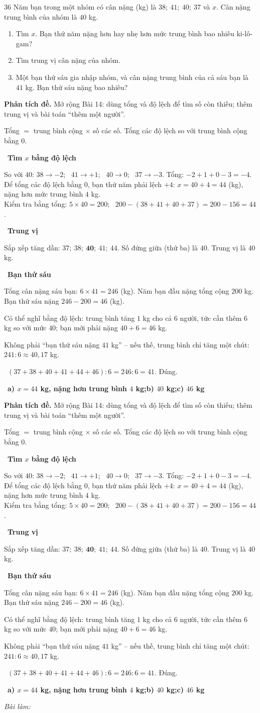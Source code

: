 \documentclass[11pt]{article}
\newif\ifsol \soltrue
\providecommand{\AnsWord}{Đáp số}
\newenvironment{probbox}[2]{\begin{probboxT}{#1}{#2}}{\end{probboxT}}
\newcommand{\StuProb}[2]{\begin{probboxS}{#1}{#2}\StuProbBody\end{probboxS}}
\newcommand{\ans}[1]{\par\smallskip{\bfseries\color{tmGreen!88!black}\AnsWord:}\ {\bfseries\color{AnsRed}#1}\par}
\newcommand{\probsol}[1]{%
  \begin{lrbox}{\solmeasure}\begin{minipage}{\dimexpr\linewidth-24pt\relax}#1\end{minipage}\end{lrbox}%
  \ifsol
    \begin{solbox}#1\end{solbox}%
  \else
    \setlength{\solht}{\dimexpr\ht\solmeasure+\dp\solmeasure+0.85cm\relax}%
    \ifdim\solht<1.35cm\setlength{\solht}{1.35cm}\fi
    \ifdim\solht>\StudentMaxWork\setlength{\solht}{\StudentMaxWork}\fi
    \par\noindent\begin{minipage}{\linewidth}%
    \expandafter\StuProb\StuProbArgs
    \begin{tcolorbox}[colback=white,colframe=Line,boxrule=0.8pt,arc=5pt,
      left=8pt,right=8pt,top=4pt,bottom=4pt,height=\solht]{\footnotesize\color{Slate}\itshape\WorkWord}\end{tcolorbox}%
    \end{minipage}\par\medskip
  \fi}
\newlength{\StudentMaxWork}\setlength{\StudentMaxWork}{4.5cm}
\newcommand{\step}[2]{\par\smallskip\noindent{\bfseries\color{tmBlue!85!black}\StepWord~#1.}\ {\bfseries #2}\par\nopagebreak}
\newcommand{\verify}[1]{\par\smallskip\noindent{\bfseries\color{tmGreen!80!black}\faCheckCircle\ \CheckWord}\ #1\par}
\def\WorkWord{Bài làm:}
\def\AnsWord{Đáp số}
\def\StepWord{Bước}
\def\CheckWord{Thử lại:}
\begin{document}
\begin{probbox}{36}{\relax}
Năm bạn trong một nhóm có cân nặng (kg) là $38;\ 41;\ 40;\ 37$ và $x$. Cân nặng trung bình của nhóm là $40$ kg.
\begin{enumerate}[label=\alph*),leftmargin=1.6em,itemsep=0pt,topsep=2pt]
  \item Tìm $x$. Bạn thứ năm nặng hơn hay nhẹ hơn mức trung bình bao nhiêu ki-lô-gam?
  \item Tìm trung vị cân nặng của nhóm.
  \item Một bạn thứ sáu gia nhập nhóm, và cân nặng trung bình của cả sáu bạn là $41$ kg. Bạn thứ sáu nặng bao nhiêu?
\end{enumerate}
\end{probbox}
\probsol{
\textbf{Phân tích đề.} Mở rộng Bài 14: dùng tổng và độ lệch để tìm số còn thiếu; thêm trung vị và bài toán ``thêm một người''.
\begin{recallbox}Tổng $=$ trung bình cộng $\times$ số các số. Tổng các độ lệch so với trung bình cộng bằng $0$.\end{recallbox}
\step{1}{Tìm $x$ bằng độ lệch}
So với $40$: $38 \to -2$; \ $41 \to +1$; \ $40 \to 0$; \ $37 \to -3$. Tổng: $-2 + 1 + 0 - 3 = -4$.\\
Để tổng các độ lệch bằng $0$, bạn thứ năm phải lệch $+4$: $x = 40 + 4 = 44$ (kg), nặng hơn mức trung bình $4$ kg.\\
Kiểm tra bằng tổng: $5\times 40 = 200$; \ $200 - (38 + 41 + 40 + 37) = 200 - 156 = 44$.
\step{2}{Trung vị}
Sắp xếp tăng dần: $37;\ 38;\ \mathbf{40};\ 41;\ 44$. Số đứng giữa (thứ ba) là $40$. Trung vị là $40$ kg.
\step{3}{Bạn thứ sáu}
Tổng cân nặng sáu bạn: $6\times 41 = 246$ (kg). Năm bạn đầu nặng tổng cộng $200$ kg. Bạn thứ sáu nặng $246 - 200 = 46$ (kg).
\begin{tipbox}Có thể nghĩ bằng độ lệch: trung bình tăng $1$ kg cho cả $6$ người, tức cần thêm $6$ kg so với mức $40$;
bạn mới phải nặng $40 + 6 = 46$ kg.\end{tipbox}
\begin{warnbox}Không phải ``bạn thứ sáu nặng $41$ kg'' -- nếu thế, trung bình chỉ tăng một chút: $241 : 6 \approx 40{,}17$ kg.\end{warnbox}
\verify{$(37 + 38 + 40 + 41 + 44 + 46) : 6 = 246 : 6 = 41$. Đúng.}
\ans{a) $x = 44$ kg, nặng hơn trung bình $4$ kg;\quad b) $40$ kg;\quad c) $46$ kg}
}
\end{document}
